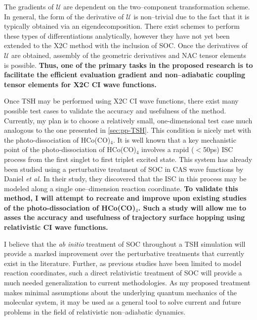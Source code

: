 The gradients of $\mathcal{U}$ are dependent on the two--component
transformation scheme. In general, the form of the derivative of $\mathcal{U}$
is non--trivial due to the fact that it is typically obtained via an
eigendecomposition.\cite{Dyall07_book,Reiher15_book} There exist schemes to perform these types of
differentiations analytically, 
\cite{Nakai16_JCTC2181,Cremer15_JCP214106,Gauss11_JCP084114}
however they have not yet been extended to the
X2C method with the inclusion of SOC.  Once the derivatives of $\mathcal{U}$ are
obtained, assembly of the geometric derivatives and NAC tensor elements is
possible. {\bf Thus, one of the primary tasks in the proposed research is to
facilitate the efficient evaluation gradient and non--adiabatic coupling tensor
elements for X2C CI wave functions.}

Once TSH may be performed using X2C CI wave functions, there exist many possible
test cases to validate the accuracy and usefulness of the method. Currently, my
plan is to choose a relatively small, one-dimensional test case much analogous
to the one presented in \cref{sec:pp-TSH}. This condition is nicely met with the
photo-dissociation of HCo(CO)$_4$. It is well known that a key mechanistic point
of the photo-dissociation of  HCo(CO)$_4$ involves a rapid ($<$50ps) ISC process
from the first singlet to first triplet excited state. \cite{Daniel97_JCP1421,
Daniel94_JPC9823} This system has already been studied using a perturbative
treatment of SOC in CAS wave functions by Daniel \emph{et al.}
\cite{Daniel97_JCP1421} In their study,
they discovered that the ISC in this process may be modeled along a single
one--dimension reaction coordinate.  {\bf To validate this method, I will
attempt to recreate and improve upon existing studies of the photo-dissociation
of HCo(CO)$_4$. Such a study will allow me to asses the accuracy and usefulness
of trajectory surface hopping using relativistic CI wave functions.}

I believe that the \emph{ab initio} treatment of SOC throughout a TSH simulation
will provide a marked improvement over the perturbative treatments that
currently exist in the literature. Further, as previous studies have been limited
to model reaction coordinates, such a direct relativistic treatment of SOC will
provide a much needed generalization to current methodologies. As my proposed
treatment makes minimal assumptions about the underlying quantum mechanics of
the molecular system, it may be used as a general tool to solve current and
future problems in the field of relativistic non--adiabatic dynamics.
